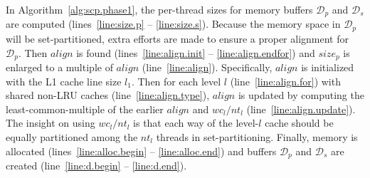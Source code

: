 In Algorithm~\ref{alg:scp.phase1},
the per-thread sizes for memory buffers $\mathcal{D}_p$ and
$\mathcal{D}_s$ are computed
(lines~\ref{line:size.p} -- \ref{line:size.s}).
Because the memory space in $\mathcal{D}_p$ will be set-partitioned,
extra efforts are made to ensure a proper alignment for $\mathcal{D}_p$.
Then $align$ is found
(lines~\ref{line:align.init} -- \ref{line:align.endfor}) 
and $size_p$ is enlarged to a multiple of $align$ (line~\ref{line:align}).
Specifically, $align$ is initialized with the L1 cache line size $l_1$.
Then for each level $l$ (line~\ref{line:align.for})
with shared non-LRU caches (line~\ref{line:align.type}),
$align$ is updated by computing the least-common-multiple of
the earlier $align$ and $wc_l/nt_l$ (line~\ref{line:align.update}).
The insight on using $wc_l/nt_l$ is that
each way of the level-$l$ cache should be
equally partitioned among the $nt_l$ threads
in set-partitioning.
Finally, memory is allocated (lines~\ref{line:alloc.begin} -- \ref{line:alloc.end})
and buffers $\mathcal{D}_p$ and $\mathcal{D}_s$
are created (line~\ref{line:d.begin} -- \ref{line:d.end}).

